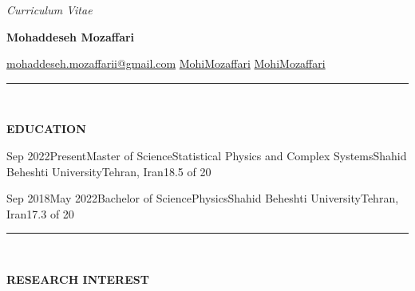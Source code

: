 \documentclass[11pt, b4paper]{cv}
\begin{document}
\begin{center}
	\textit{Curriculum Vitae}\\
	{\Large \textbf{Mohaddeseh Mozaffari}\par}
	\href{mailto:mohaddeseh.mozaffarii@gmail.com}{ mohaddeseh.mozaffarii@gmail.com}
	\hspace{5pt} 
	\href{https://www.linkedin.com/in/MohiMozaffari/}{ MohiMozaffari}
	\hspace{5pt} 
	\href{https://github.com/MohiMozaffari}{ MohiMozaffari}
\end{center}


\vspace{-0.15in}
\rule{\textwidth}{1pt}\\
\vspace{-0.15in}

\textbf{EDUCATION}

\begin{education}{Sep 2022}{Present}{Master of Science}{Statistical Physics and Complex Systems}{Shahid Beheshti University}{Tehran, Iran}{18.5 of 20}
\end{education}
\begin{education}{Sep 2018}{May 2022}{Bachelor of Science}{Physics}{Shahid Beheshti University}{Tehran, Iran}{17.3 of 20}
\end{education}

\vspace{-0.15in}
\rule{\textwidth}{1pt}\\
\vspace{-0.15in}

\textbf{RESEARCH INTEREST}
\vspace{-0.1in}



\end{document}
